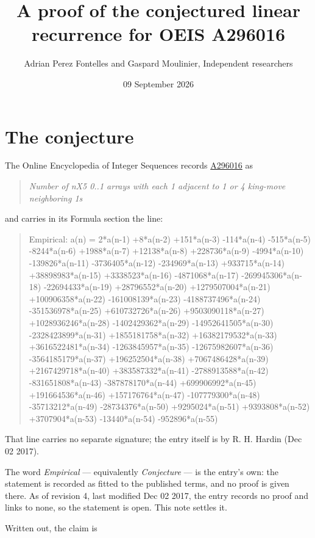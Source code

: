 \documentclass[11pt]{article}
\title{A proof of the conjectured linear recurrence for OEIS A296016}
\author{Adrian Perez Fontelles and Gaspard Moulinier, Independent researchers}
\date{09 September 2026}
\theoremstyle{definition}
\begin{document}
\maketitle
\section{The conjecture}

The Online Encyclopedia of Integer Sequences records \href{https://oeis.org/A296016}{A296016} as

\begin{quote}\itshape Number of nX5 0..1 arrays with each 1 adjacent to 1 or 4 king-move neighboring 1s\end{quote}

and carries in its Formula section the line:

\begin{quote}\ttfamily Empirical: a(n) = 2*a(n-1) +8*a(n-2) +151*a(n-3) -114*a(n-4) -515*a(n-5) -8244*a(n-6) +1988*a(n-7) +12138*a(n-8) +228736*a(n-9) -4994*a(n-10) -139826*a(n-11) -3736405*a(n-12) -234969*a(n-13) +933715*a(n-14) +38898983*a(n-15) +3338523*a(n-16) -4871068*a(n-17) -269945306*a(n-18) -22694433*a(n-19) +28796552*a(n-20) +1279507004*a(n-21) +100906358*a(n-22) -161008139*a(n-23) -4188737496*a(n-24) -351536978*a(n-25) +610732726*a(n-26) +9503090118*a(n-27) +1028936246*a(n-28) -1402429362*a(n-29) -14952641505*a(n-30) -2328423899*a(n-31) +1855181758*a(n-32) +16382179532*a(n-33) +3616522481*a(n-34) -1263845957*a(n-35) -12675982607*a(n-36) -3564185179*a(n-37) +196252504*a(n-38) +7067486428*a(n-39) +2167429718*a(n-40) +383587332*a(n-41) -2788913588*a(n-42) -831651808*a(n-43) -387878170*a(n-44) +699906992*a(n-45) +191664536*a(n-46) +157176764*a(n-47) -107779300*a(n-48) -35713212*a(n-49) -28734376*a(n-50) +9295024*a(n-51) +9393808*a(n-52) +3707904*a(n-53) -13440*a(n-54) -952896*a(n-55)\end{quote}

That line carries no separate signature; the entry itself is by R. H. Hardin (Dec 02 2017).

The word {\itshape Empirical} --- equivalently {\itshape Conjecture} --- is the entry's own: the statement is recorded as fitted to the published terms, and no proof is given there. As of revision 4, last modified Dec 02 2017, the entry records no proof and links to none, so the statement is open. This note settles it.

Written out, the claim is
\end{document}
